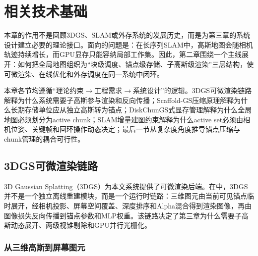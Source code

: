 \chapter{相关技术基础}

本章的作用不是回顾3DGS、SLAM或外存系统的发展历史，而是为第三章的系统设计建立必要的理论接口。\ScaffoldChunGS 面向的问题是：在长序列SLAM中，高斯地图会随相机轨迹持续增长，而GPU显存只能容纳局部工作集。因此，第二章围绕一个主线展开：如何把全局地图组织为``块级调度、锚点级存储、子高斯级渲染''三层结构，使可微渲染、在线优化和外存调度在同一系统中闭环。

本章各节均遵循``理论约束$\rightarrow$工程需求$\rightarrow$系统设计''的逻辑。3DGS可微渲染链路解释为什么系统需要子高斯参与渲染和反向传播；Scaffold-GS压缩原理解释为什么长期存储单位应从独立高斯转为锚点；DiskChunGS式显存管理解释为什么全局地图必须划分为active chunk；SLAM增量建图约束解释为什么active set必须由相机位姿、关键帧和回环操作动态决定；最后一节从复杂度角度推导锚点压缩与chunk管理的耦合可行性。

\section{3DGS可微渲染链路}

3D Gaussian Splatting（3DGS）为本文系统提供了可微渲染后端\cite{kerbl20233dgaussians}。在\ScaffoldChunGS 中，3DGS并不是一个独立离线重建模块，而是一个运行时链路：三维图元由当前可见锚点临时展开，经相机投影、屏幕空间覆盖、深度排序和Alpha混合得到渲染图像，再由图像损失反向传播到锚点参数和MLP权重。该链路决定了第三章为什么需要子高斯动态展开、两级视锥剔除和GPU并行光栅化。

\subsection{从三维高斯到屏幕图元}

